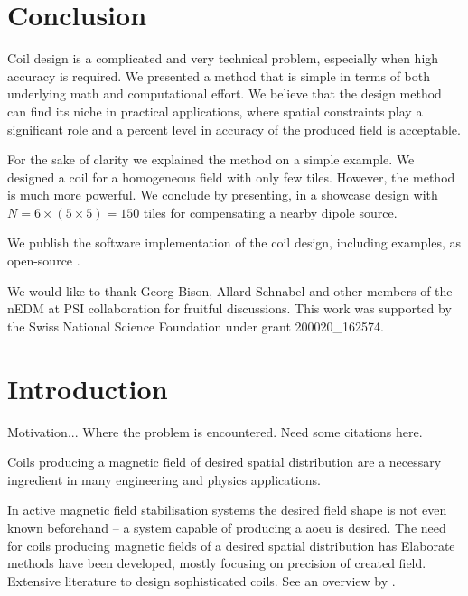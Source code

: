 \section{Conclusion}
Coil design is a complicated and very technical problem, especially when high accuracy is required. We presented a method that is simple in terms of both underlying math and computational effort. We believe that the design method can find its niche in practical applications, where spatial constraints play a significant role and a percent level in accuracy of the produced field is acceptable.

For the sake of clarity we explained the method on a simple example. We designed a coil for a homogeneous field with only few tiles. However, the method is much more powerful. We conclude by presenting, in
a showcase design with $N = 6 \times (5 \times 5) = 150$ tiles for compensating a nearby dipole source. 

We publish the software implementation of the coil design, including examples, as open-source \cite{Coilsjlcode}.

We would like to thank Georg Bison, Allard Schnabel and other members of the nEDM at PSI collaboration for fruitful discussions. This work was supported by the Swiss National Science Foundation under grant 200020\_162574.
  











\section{Introduction}

Motivation... Where the problem is encountered. Need some citations here.

Coils producing a magnetic field of desired spatial distribution are a necessary ingredient in many engineering and physics applications.

In active magnetic field stabilisation systems the desired field shape is not even known beforehand -- a system capable of producing a aoeu is desired.
The need for coils producing magnetic fields of a desired spatial distribution has
Elaborate methods have been developed, mostly focusing on precision of created field.
Extensive literature to design sophisticated coils.
See an overview by \citeauthor{Turner1993} \citep{Turner1993}.

